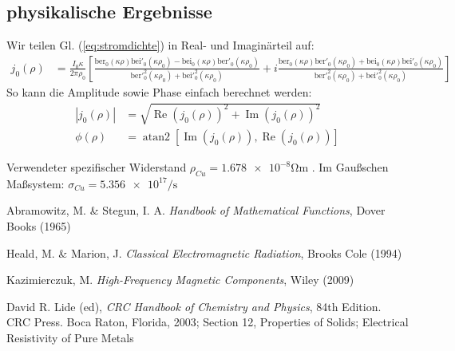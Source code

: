 \documentclass[10pt,a4paper]{article}
\begin{document}
\subsection{physikalische Ergebnisse}
Wir teilen Gl. (\ref{eq:stromdichte}) in Real- und Imaginärteil auf:
\begin{align}
	j_0(\rho) &= \frac{I_0 \kappa}{2 \pi \rho_0} \left[ \frac{\mathrm{ber}_0(\kappa \rho)\mathrm{bei}'_0(\kappa \rho_0) - \mathrm{bei}_0(\kappa \rho)\mathrm{ber}'_0(\kappa \rho_0)}{\mathrm{ber}'^2_0(\kappa \rho_0)+\mathrm{bei}'^2_0(\kappa \rho_0)} + i\frac{\mathrm{ber}_0(\kappa \rho)\mathrm{ber}'_0(\kappa \rho_0) + \mathrm{bei}_0(\kappa \rho)\mathrm{bei}'_0(\kappa \rho_0)}{\mathrm{ber}'^2_0(\kappa \rho_0)+\mathrm{bei}'^2_0(\kappa \rho_0)}\right]
\end{align}
So kann die Amplitude sowie Phase einfach berechnet werden:
\begin{align}
	|j_0(\rho)| &= \sqrt{\operatorname{Re}(j_0(\rho))^2 + \operatorname{Im}(j_0(\rho))^2}\\
	\phi(\rho) &= \operatorname{atan2}\left[\operatorname{Im}(j_0(\rho)), \operatorname{Re}(j_0(\rho))\right]
\end{align}

Verwendeter spezifischer Widerstand $\rho_{Cu} = \num{1.678e-8} \si{\ohm\metre}$ \cite{crchandbook}.
Im Gaußschen Maßsystem: $\sigma_{Cu} = \num{5.356e17} \si{\per\second}$


\newline


\begin{thebibliography}{9}

Abramowitz, M. \& Stegun, I. A.
\emph{Handbook of Mathematical Functions},
Dover Books (1965)

Heald, M. \& Marion, J.
\emph{Classical Electromagnetic Radiation},
Brooks Cole (1994)

Kazimierczuk, M.
\emph{High-Frequency Magnetic Components},
Wiley (2009)

David R. Lide (ed),
\emph{CRC Handbook of Chemistry and Physics},
84th Edition. CRC Press. Boca Raton, Florida, 2003;
Section 12, Properties of Solids; Electrical Resistivity of Pure Metals

\end{thebibliography}
\end{document}
